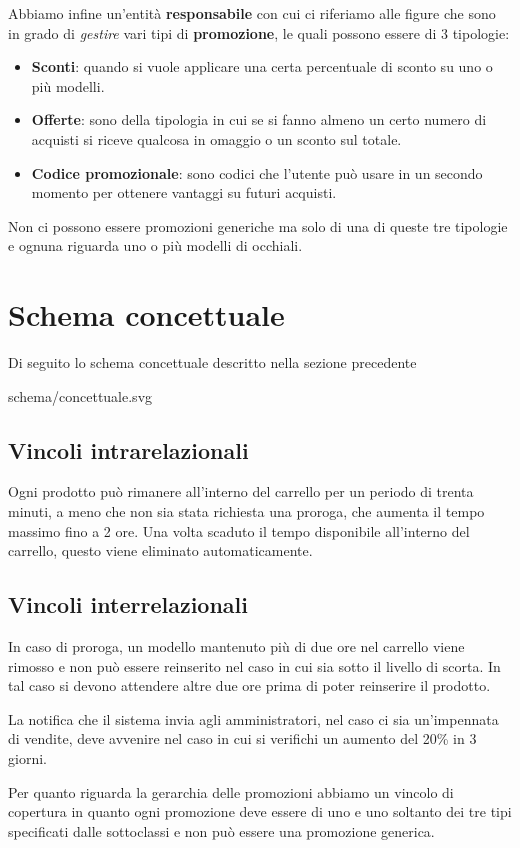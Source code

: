 \documentclass[12pt, a4paper]{article}
\begin{document}
Abbiamo infine un'entità \textbf{responsabile} con cui ci riferiamo alle figure che sono in
grado di \emph{gestire} vari tipi di \textbf{promozione}, le quali possono essere di 3 tipologie:
\begin{itemize}
	\item \textbf{Sconti}: quando si vuole applicare una certa percentuale di sconto su uno o più
	      modelli.
	\item \textbf{Offerte}: sono della tipologia in cui se si fanno almeno un certo numero di
	      acquisti si riceve qualcosa in omaggio o un sconto sul totale.
	\item \textbf{Codice promozionale}: sono codici che l'utente può usare in un secondo momento
	      per ottenere vantaggi su futuri acquisti.
\end{itemize}
Non ci possono essere promozioni generiche ma solo di una di queste tre tipologie e ognuna riguarda
uno o più modelli di occhiali.

\section{Schema concettuale}
Di seguito lo schema concettuale descritto nella sezione precedente

 {schema/concettuale.svg}

\subsection{Vincoli intrarelazionali}
Ogni prodotto può rimanere all'interno del carrello per un periodo di trenta minuti, a meno che
non sia stata richiesta una proroga, che aumenta il tempo massimo fino a 2 ore. Una volta
scaduto il tempo disponibile all'interno del carrello, questo viene eliminato automaticamente.

\subsection{Vincoli interrelazionali}
In caso di proroga, un modello mantenuto più di due ore nel carrello viene rimosso e non può
essere reinserito nel caso in cui sia sotto il livello di scorta. In tal caso si devono attendere
altre due ore prima di poter reinserire il prodotto.

La notifica che il sistema invia agli amministratori, nel caso ci sia un'impennata di vendite,
deve avvenire nel caso in cui si verifichi un aumento del 20\% in 3 giorni.

Per quanto riguarda la gerarchia delle promozioni abbiamo un vincolo di copertura in quanto ogni
promozione deve essere di uno e uno soltanto dei tre tipi specificati dalle sottoclassi e non può
essere una promozione generica.
\end{document}
